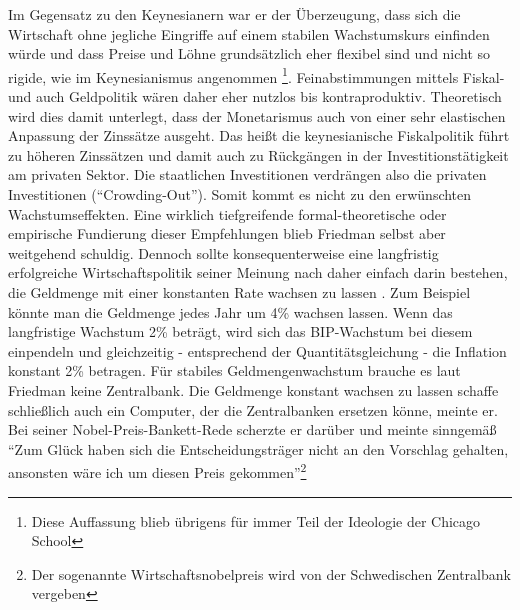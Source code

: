 Im Gegensatz zu den Keynesianern war er der Überzeugung, dass sich die Wirtschaft ohne jegliche Eingriffe auf einem stabilen Wachstumskurs einfinden würde und dass Preise und Löhne grundsätzlich eher flexibel sind und nicht so rigide, wie im Keynesianismus angenommen \footnote{Diese Auffassung blieb übrigens für immer Teil der Ideologie der Chicago School}. Feinabstimmungen mittels Fiskal- und auch Geldpolitik wären daher eher nutzlos bis kontraproduktiv. Theoretisch wird dies damit unterlegt, dass der Monetarismus auch von einer sehr elastischen Anpassung der Zinssätze ausgeht. Das heißt die keynesianische Fiskalpolitik führt zu höheren Zinssätzen und damit auch zu Rückgängen in der Investitionstätigkeit am privaten Sektor. Die staatlichen Investitionen verdrängen also die privaten Investitionen ("`Crowding-Out"'). Somit kommt es nicht zu den erwünschten Wachstumseffekten. Eine wirklich tiefgreifende formal-theoretische oder empirische Fundierung dieser Empfehlungen blieb Friedman selbst aber weitgehend schuldig.
Dennoch sollte konsequenterweise eine langfristig erfolgreiche Wirtschaftspolitik seiner Meinung nach daher einfach darin bestehen, die Geldmenge mit einer konstanten Rate wachsen zu lassen \parencite{Friedman1960}. Zum Beispiel könnte man die Geldmenge jedes Jahr um 4\% wachsen lassen. Wenn das langfristige Wachstum 2\% beträgt, wird sich das BIP-Wachstum bei diesem einpendeln und gleichzeitig - entsprechend der Quantitätsgleichung - die Inflation konstant 2\% betragen. Für stabiles Geldmengenwachstum brauche es laut Friedman keine Zentralbank. Die Geldmenge konstant wachsen zu lassen schaffe schließlich auch ein Computer, der die Zentralbanken ersetzen könne, meinte er. Bei seiner Nobel-Preis-Bankett-Rede \parencite{Friedman1976b} scherzte er darüber und meinte sinngemäß "`Zum Glück haben sich die Entscheidungsträger nicht an den Vorschlag gehalten, ansonsten wäre ich um diesen Preis gekommen"'\footnote{Der sogenannte Wirtschaftsnobelpreis wird von der Schwedischen Zentralbank vergeben}


